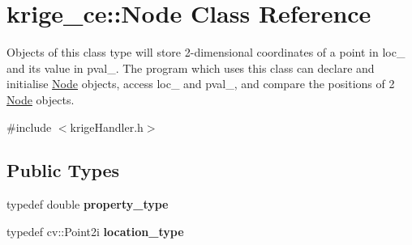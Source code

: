 \hypertarget{classkrige__ce_1_1Node}{}\section{krige\+\_\+ce\+:\+:Node Class Reference}
\label{classkrige__ce_1_1Node}


Objects of this class type will store 2-\/dimensional coordinates of a point in loc\+\_\+ and its value in pval\+\_\+. The program which uses this class can declare and initialise \hyperlink{classkrige__ce_1_1Node}{Node} objects, access loc\+\_\+ and pval\+\_\+, and compare the positions of 2 \hyperlink{classkrige__ce_1_1Node}{Node} objects.  




{\ttfamily \#include $<$krige\+Handler.\+h$>$}

\subsection*{Public Types}
\begin{DoxyCompactItemize}
\item 
\mbox{\label{classkrige__ce_1_1Node_a8e86ba6918f038a7bfdd43dce943c21c}} 
typedef double {\bfseries property\+\_\+type}
\item 
\mbox{\label{classkrige__ce_1_1Node_aa95924c435b829ac68401c14fae1e268}} 
typedef cv\+::\+Point2i {\bfseries location\+\_\+type}
\end{DoxyCompactItemize}
